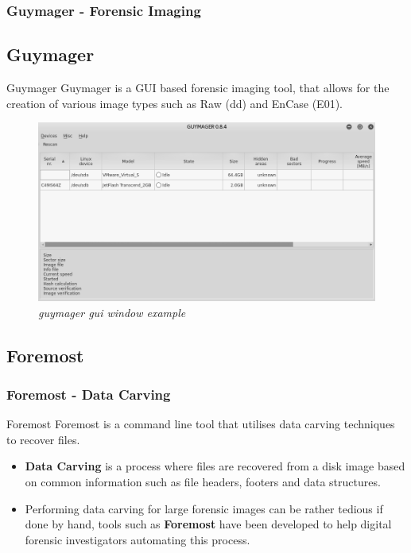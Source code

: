 \documentclass{beamer}
\begin{document}
\begin{frame}
	\frametitle{Guymager - Forensic Imaging}
	\subsection*{Guymager}
	\begin{block}{Guymager}
		Guymager is a GUI based forensic imaging tool, that allows for the creation of various image types such as Raw (dd) and EnCase (E01).
	\end{block}
	\begin{figure}[h]
		\centering
		\includegraphics[scale=0.29]{guymager-window}
		\caption{\textit{guymager gui window example}}
		\label{fig:guymager-main-window}
	\end{figure}
\end{frame}

\begin{frame}
	\subsection*{Foremost}
	\frametitle{Foremost - Data Carving}
	\begin{block}{Foremost}
		Foremost is a command line tool that utilises data carving techniques to recover files.
	\end{block}
	\begin{itemize}
		\item \textbf{Data Carving} is a process where files are recovered from a disk image based on common information such as file headers, footers and data structures. 
		\item Performing data carving for large forensic images can be rather tedious if done by hand, tools such as \textbf{Foremost} have been developed to help digital forensic investigators automating this process.
	\end{itemize}
\end{frame}
\end{document}
